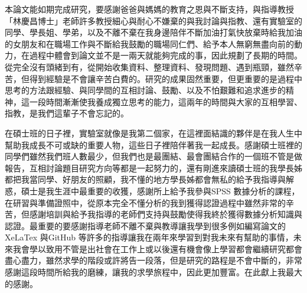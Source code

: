 本論文能如期完成研究，要感謝爸爸與媽媽的教育之恩與不斷支持，與指導教授「林慶昌博士」老師許多教授細心與耐心不嫌棄的與我討論與指教、還有實驗室的同學、學長姐、學弟，以及不離不棄在我身邊陪伴不斷加油打氣快放棄時給我加油的女朋友和在職場工作與不斷給我鼓勵的職場同仁們、給予本人無窮無盡向前的動力，在過程中體會到論文並不是一兩天就能夠完成的事，因此規劃了長期的時間。從完全沒有頭緒到有，從開始收集資料、整理資料、發現問題、遇到瓶頸，雖然辛苦，但得到經驗是不會讓辛苦白費的。研究的成果固然重要，但更重要的是過程中思考的方法跟經驗、與同學間的互相討論、鼓勵、以及不怕艱難和追求進步的精神，這一段時間漸漸使我養成獨立思考的能力，這兩年的時間與大家的互相學習、指教，是我們這輩子不會忘記的。

在碩士班的日子裡，實驗室就像是我第二個家，在這裡面結識的夥伴是在我人生中幫助我成長不可或缺的重要人物，這些日子裡陪伴著我一起成長。感謝碩士班裡的同學們雖然我們班人數最少，但我們也是最團結、最會團結合作的一個班不管是做報告，互相討論題目研究方向等都是一起努力的，還有剛進來讀碩士班的我學長姊都把我當同學、好朋友的照顧，我不懂的地方學長姊都會無私的給予我指導與解惑，碩士是我生涯中最重要的收獲，感謝所上給予我參與SPSS 數據分析的課程，在研習與準備證照中，從原本完全不懂分析的我到獲得認證過程中雖然非常的辛苦，但感謝培訓與給予我指導的老師們支持與鼓勵使得我終於獲得數據分析知識與認證。最重要的要感謝指導老師不離不棄與教導讓我學到很多例如編寫論文的XeLaTex 與GitHub 等許多的指導讓我在兩年來學習到對我未來有幫助的事情，未來我會學以致用不管是出社會在工作上或以後還有機會像上學習都會繼續研究都會盡心盡力，雖然求學的階段或許將告一段落，但是研究的路程是不會中斷的，非常感謝這段時間所給我的磨練，讓我的求學旅程中，因此更加豐富。在此獻上我最大的感謝。



